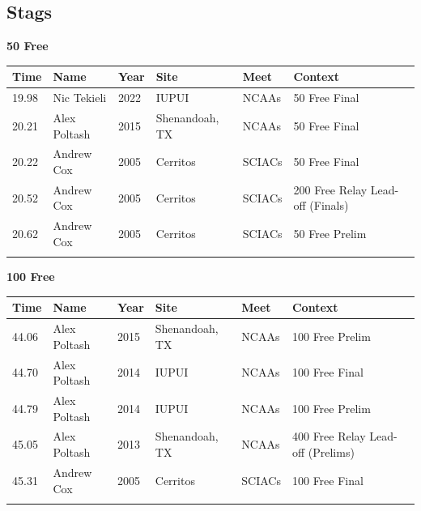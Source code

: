 \subsection{Stags}
\vspace{2.0em}
\noindent\begin{minipage}[t]{0.98\textwidth}
\centering
\textbf{\textcolor{teamprimary}{50 Free}}\par
\vspace{0.5em}
\centering
\small
\renewcommand{\arraystretch}{1.0}
\setlength{\tabcolsep}{4pt}
\begin{tabular}{@{}p{2.0cm}p{3.2cm}p{1.2cm}p{2.0cm}p{2.0cm}p{2.5cm}@{}}
\toprule
\textbf{Time} & \textbf{Name} & \textbf{Year} & \textbf{Site} & \textbf{Meet} & \textbf{Context} \\
\midrule
19.98 & Nic Tekieli & 2022 & IUPUI & NCAAs & 50 Free Final \\
20.21 & Alex Poltash & 2015 & Shenandoah, TX & NCAAs & 50 Free Final \\
20.22 & Andrew Cox & 2005 & Cerritos & SCIACs & 50 Free Final \\
20.52 & Andrew Cox & 2005 & Cerritos & SCIACs & 200 Free Relay Lead-off (Finals) \\
20.62 & Andrew Cox & 2005 & Cerritos & SCIACs & 50 Free Prelim \\
\bottomrule
\vspace{0.5em}
\end{tabular}
\end{minipage}
\vspace{2.5em}
\noindent\begin{minipage}[t]{0.98\textwidth}
\centering
\textbf{\textcolor{teamprimary}{100 Free}}\par
\vspace{0.5em}
\centering
\small
\renewcommand{\arraystretch}{1.0}
\setlength{\tabcolsep}{4pt}
\begin{tabular}{@{}p{2.0cm}p{3.2cm}p{1.2cm}p{2.0cm}p{2.0cm}p{2.5cm}@{}}
\toprule
\textbf{Time} & \textbf{Name} & \textbf{Year} & \textbf{Site} & \textbf{Meet} & \textbf{Context} \\
\midrule
44.06 & Alex Poltash & 2015 & Shenandoah, TX & NCAAs & 100 Free Prelim \\
44.70 & Alex Poltash & 2014 & IUPUI & NCAAs & 100 Free Final \\
44.79 & Alex Poltash & 2014 & IUPUI & NCAAs & 100 Free Prelim \\
45.05 & Alex Poltash & 2013 & Shenandoah, TX & NCAAs & 400 Free Relay Lead-off (Prelims) \\
45.31 & Andrew Cox & 2005 & Cerritos & SCIACs & 100 Free Final \\
\bottomrule
\vspace{0.5em}
\end{tabular}
\end{minipage}
